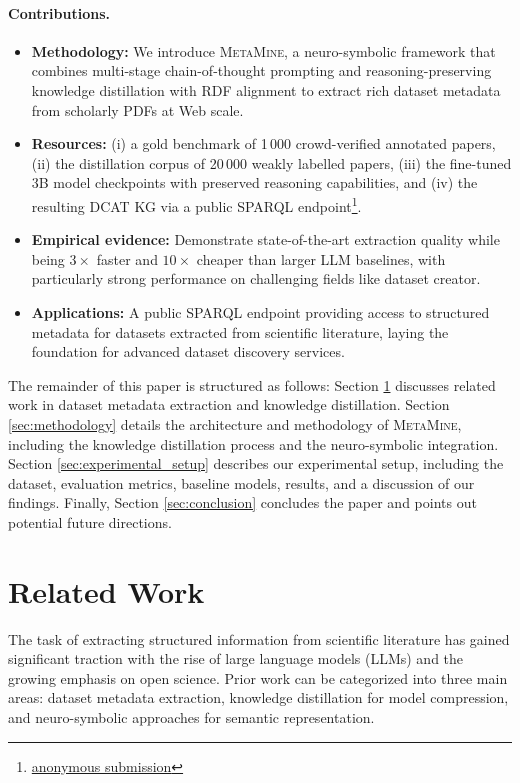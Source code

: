 \documentclass[runningheads]{llncs}
\begin{document}
\paragraph{Contributions.}
\vspace{-2mm}
\begin{itemize}
  \setlength\itemsep{2pt}
  \item \textbf{Methodology:} We introduce \textsc{MetaMine}, a neuro-symbolic framework that combines multi-stage chain-of-thought prompting and reasoning-preserving knowledge distillation with RDF alignment to extract rich dataset metadata from scholarly PDFs at Web scale.
  \item \textbf{Resources:} (i) a gold benchmark of 1\,000 crowd-verified annotated papers, (ii) the distillation corpus of 20\,000 weakly labelled papers, (iii) the fine-tuned 3B model checkpoints with preserved reasoning capabilities, and (iv) the resulting DCAT KG via a public SPARQL endpoint\footnote{\url{anonymous submission}}.
  \item \textbf{Empirical evidence:} Demonstrate state-of-the-art extraction quality while being \(3\times\) faster and \(10\times\) cheaper than larger LLM baselines, with particularly strong performance on challenging fields like dataset creator.
  \item \textbf{Applications:} A public SPARQL endpoint providing access to structured metadata for datasets extracted from scientific literature, laying the foundation for advanced dataset discovery services.
\end{itemize}
\vspace{-2mm}
\noindent
The remainder of this paper is structured as follows: Section \ref{sec:related_work} discusses related work in dataset metadata extraction and knowledge distillation. Section \ref{sec:methodology} details the architecture and methodology of \textsc{MetaMine}, including the knowledge distillation process and the neuro-symbolic integration. Section \ref{sec:experimental_setup} describes our experimental setup, including the dataset, evaluation metrics, baseline models, results, and a discussion of our findings. Finally, Section \ref{sec:conclusion} concludes the paper and points out potential future directions.

\section{Related Work}
\label{sec:related_work}
The task of extracting structured information from scientific literature has gained significant traction with the rise of large language models (LLMs) and the growing emphasis on open science. Prior work can be categorized into three main areas: dataset metadata extraction, knowledge distillation for model compression, and neuro-symbolic approaches for semantic representation.
\end{document}
